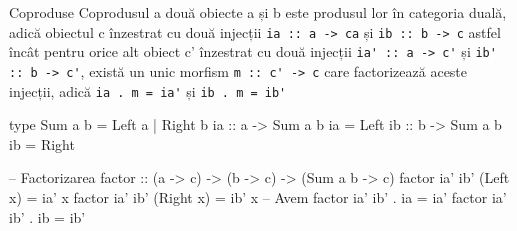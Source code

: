 \documentclass[xcolor=pdftex,romanian,colorlinks]{beamer}
\begin{document}
\begin{frame}[fragile]{Coproduse}
Coprodusul a două obiecte a și b este produsul lor în categoria duală, adică obiectul c înzestrat cu două injecții 
\lstinline$ia :: a -> ca$ și \lstinline$ib :: b -> c$ astfel încât pentru orice alt obiect c' înzestrat cu două injecții \lstinline$ia' :: a -> c'$ și \lstinline$ib' :: b -> c'$, există un unic morfism \lstinline$m :: c' -> c$ care factorizează aceste injecții, adică \lstinline$ia . m = ia'$ și \lstinline$ib . m = ib'$
\vspace{-1ex}
\begin{asciihs}
type Sum a b = Left a | Right b
ia :: a -> Sum a b
ia = Left
ib :: b -> Sum a b
ib = Right

-- Factorizarea
factor  :: (a -> c) -> (b -> c) -> (Sum a b -> c)
factor ia' ib' (Left x) = ia' x
factor ia' ib' (Right x) = ib' x
-- Avem
factor ia' ib' . ia = ia'        factor ia' ib' . ib = ib'
\end{asciihs}
\end{frame}
\end{document}
